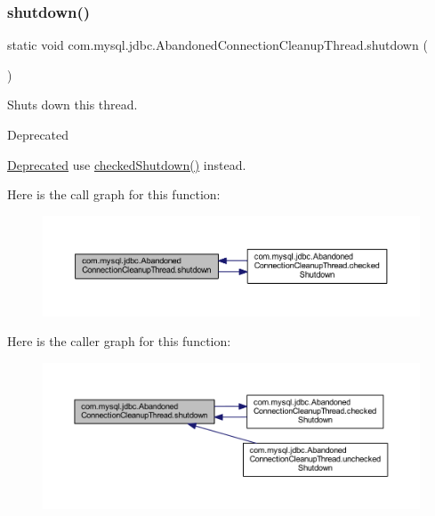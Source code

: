\subsubsection{\texorpdfstring{shutdown()}{shutdown()}}
{\footnotesize\ttfamily static void com.\+mysql.\+jdbc.\+Abandoned\+Connection\+Cleanup\+Thread.\+shutdown (\begin{DoxyParamCaption}{ }\end{DoxyParamCaption})\hspace{0.3cm}{\ttfamily [static]}}

Shuts down this thread.

\begin{DoxyRefDesc}{Deprecated}
\item[\mbox{\hyperlink{deprecated__deprecated000004}{Deprecated}}]use \mbox{\hyperlink{classcom_1_1mysql_1_1jdbc_1_1_abandoned_connection_cleanup_thread_a1f3b87e39a583628bdae7b298b3882c3}{checked\+Shutdown()}} instead. \end{DoxyRefDesc}
Here is the call graph for this function\+:\nopagebreak
\begin{figure}[H]
\begin{center}
\leavevmode
\includegraphics[width=350pt]{classcom_1_1mysql_1_1jdbc_1_1_abandoned_connection_cleanup_thread_aadfff88a87e766a3c6ad7cc6ced32b89_cgraph}
\end{center}
\end{figure}
Here is the caller graph for this function\+:\nopagebreak
\begin{figure}[H]
\begin{center}
\leavevmode
\includegraphics[width=350pt]{classcom_1_1mysql_1_1jdbc_1_1_abandoned_connection_cleanup_thread_aadfff88a87e766a3c6ad7cc6ced32b89_icgraph}
\end{center}
\end{figure}
\mbox{\label{classcom_1_1mysql_1_1jdbc_1_1_abandoned_connection_cleanup_thread_abf43aba7ad8fa551a194474046c02235}} 
